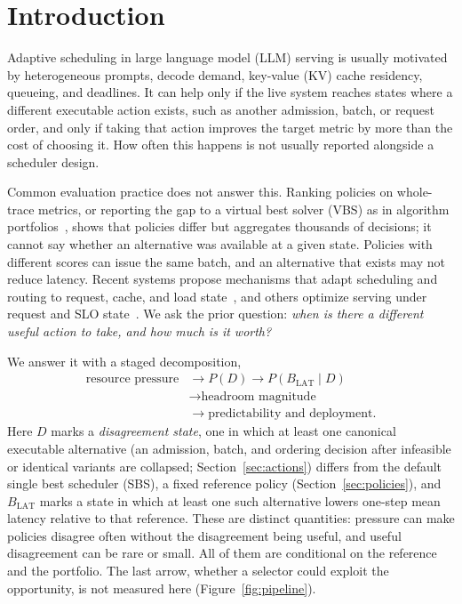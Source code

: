\documentclass[preprint,12pt]{elsarticle}
\begin{document}
\section{Introduction}
\label{sec:introduction}

Adaptive scheduling in large language model (LLM) serving is usually motivated
by heterogeneous prompts, decode demand, key-value (KV) cache residency,
queueing, and deadlines. It can help only if the live system reaches states
where a different executable action exists, such as another admission, batch,
or request order, and only if taking that action improves the target metric by
more than the cost of choosing it. How often this happens is not usually
reported alongside a scheduler design.

Common evaluation practice does not answer this. Ranking policies on
whole-trace metrics, or reporting the gap to a virtual best solver (VBS) as in
algorithm portfolios~\cite{rice1976algorithmselection,gomes2001portfolios},
shows that policies differ but aggregates thousands of decisions; it cannot say
whether an alternative was available at a given state. Policies with different
scores can issue the same batch, and an alternative that exists may not reduce
latency. Recent systems propose mechanisms that adapt scheduling and routing to
request, cache, and load state~\cite{llumnix2024,preble2025,lmetric2026}, and
others optimize serving under request and SLO state~\cite{sola2025,jitserve2026,adaserve2026}. We ask the prior question: \emph{when is
there a different useful action to take, and how much is it worth?}

We answer it with a staged decomposition,
\begin{equation}
  \begin{aligned}
  \text{resource pressure}&\longrightarrow P(D)\longrightarrow
  P(B_{\mathrm{LAT}}\mid D)\\
  &\longrightarrow\text{headroom magnitude}\\
  &\longrightarrow\text{predictability and deployment}.
  \end{aligned}
  \label{eq:chain}
\end{equation}
Here $D$ marks a \emph{disagreement state}, one in which at least one canonical
executable alternative (an admission, batch, and ordering decision after
infeasible or identical variants are collapsed; Section~\ref{sec:actions})
differs from the default single best scheduler (SBS), a fixed reference policy
(Section~\ref{sec:policies}), and $B_{\mathrm{LAT}}$ marks a state in which at
least one such alternative lowers one-step mean latency relative to that
reference. These are distinct quantities: pressure can
make policies disagree often without the disagreement being useful, and useful
disagreement can be rare or small. All of them are conditional on the reference
and the portfolio. The last arrow, whether a selector could exploit the
opportunity, is not measured here (Figure~\ref{fig:pipeline}).
\end{document}
